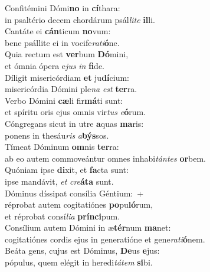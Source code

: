 \evenverse Confitémini Dómi\textbf{no} in \textbf{cí}thara:~\*\\
\evenverse in psaltério decem chordárum psál\textit{li}\textit{te} \textbf{il}li.\\
\oddverse Cantáte ei \textbf{cán}ticum \textbf{no}vum:~\*\\
\oddverse bene psállite ei in vocife\textit{ra}\textit{ti}\textbf{ó}ne.\\
\evenverse Quia rectum est \textbf{ver}bum \textbf{Dó}mini,~\*\\
\evenverse et ómnia ópera e\textit{jus} \textit{in} \textbf{fi}de.\\
\oddverse Díligit misericórdiam \textbf{et} ju\textbf{dí}cium:~\*\\
\oddverse misericórdia Dómini ple\textit{na} \textit{est} \textbf{ter}ra.\\
\evenverse Verbo Dómini \textbf{cæ}li fir\textbf{má}ti sunt:~\*\\
\evenverse et spíritu oris ejus omnis vir\textit{tus} \textit{e}\textbf{ó}rum.\\
\oddverse Cóngregans sicut in utre \textbf{a}quas \textbf{ma}ris:~\*\\
\oddverse ponens in thesáu\textit{ris} \textit{a}\textbf{býs}sos.\\
\evenverse Tímeat Dóminum \textbf{om}nis \textbf{ter}ra:~\*\\
\evenverse ab eo autem commoveántur omnes inhabi\textit{tán}\textit{tes} \textbf{or}bem.\\
\oddverse Quóniam ipse \textbf{di}xit, et \textbf{fa}cta sunt:~\*\\
\oddverse ipse mandávit, \textit{et} \textit{cre}\textbf{á}\textbf{ta} sunt.\\
\evenverse Dóminus díssipat consília Géntium:~+\\
\evenverse  réprobat autem cogitatiónes \textbf{po}pu\textbf{ló}rum,~\*\\
\evenverse et réprobat consí\textit{li}\textit{a} \textbf{prín}\textbf{ci}pum.\\
\oddverse Consílium autem Dómini in æ\textbf{tér}num \textbf{ma}net:~\*\\
\oddverse cogitatiónes cordis ejus in generatióne et gene\textit{ra}\textit{ti}\textbf{ó}nem.\\
\evenverse Beáta gens, cujus est Dóminus, \textbf{De}us \textbf{e}jus:~\*\\
\evenverse pópulus, quem elégit in heredi\textit{tá}\textit{tem} \textbf{si}bi.\\
